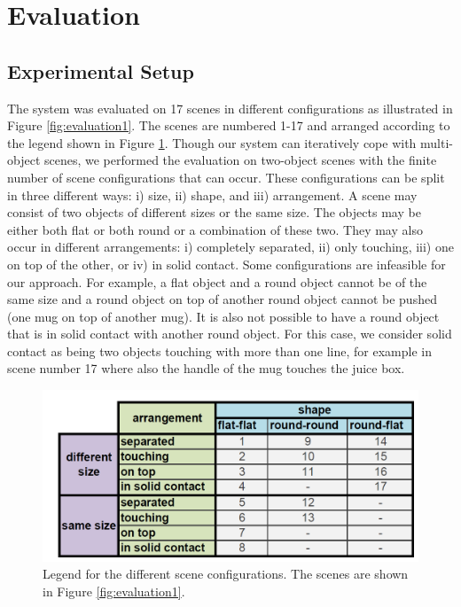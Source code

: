 \section{Evaluation}
\label{sec:evaluation}
\subsection{Experimental Setup}
The system was evaluated on 17 scenes in different configurations
as illustrated in Figure \ref{fig:evaluation1}. The   scenes  are   
numbered  1-17 and arranged according to the legend shown in Figure \ref{fig:table_scenes}.
Though our system can iteratively
cope with multi-object scenes, we performed the evaluation on two-object
scenes with the  finite number  of scene
configurations that  can occur. These configurations  can be split in  three different
ways: i)  size, ii) shape, and iii)  arrangement.  A scene may
consist  of two  objects  of different  sizes  or the  same size.  The
objects may  be either both  flat or both round  or a combination  of these
two.  They  may  also  occur  in  different  arrangements: i) completely
separated, ii) only  touching, iii) one on  top of the other,  or iv) in solid
contact. Some configurations are
infeasible for our approach.  For example, a flat  object and a
round  object cannot  be of the  same  size and a round object  on top  of
another  round object  cannot be  pushed (one  mug on  top  of another
mug). It is also not possible to  have a round object that is in solid
contact with  another round  object. For this  case, we  consider solid
contact as  being two objects touching  with more than  one line, for
example in scene number 17 where also  the handle of the mug  touches the juice box.  

\begin{figure}[ht!]
  \centering \includegraphics[width=0.8\columnwidth]{figures/table_scenes.png}
  \vspace{-2ex}
  \caption{Legend for the different scene configurations. The scenes are shown in Figure \ref{fig:evaluation1}.
  }
  \label{fig:table_scenes}
\end{figure}

